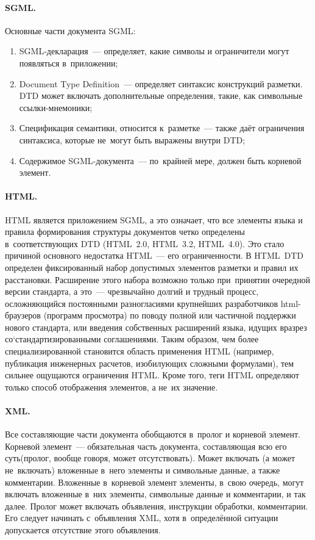 \documentclass[12pt]{article}
\theoremstyle{definition}
\theoremstyle{remark}
\numberwithin{equation}{section}
\begin{document}
\paragraph{SGML.}
Основные части документа SGML:
\begin{enumerate}
	\item SGML-декларация~--- определяет, какие символы и ограничители
    могут появляться в~приложении;
	\item Document Type Definition~--- определяет синтаксис конструкций
    разметки. DTD может включать дополнительные определения, такие,
    как символьные ссылки\nobreakdash-мнемоники;
	\item Спецификация семантики, относится к~разметке~--- также
    даёт ограничения синтаксиса, которые не~могут быть выражены
    внутри DTD;
	\item Содержимое SGML\nobreakdash-документа~--- по~крайней мере,
    должен быть корневой элемент.
\end{enumerate}

\paragraph{HTML.}
HTML является приложением SGML, а это означает, что все элементы языка
и правила формирования структуры документов четко определены в~соответствующих
DTD (HTML~2.0, HTML~3.2, HTML~4.0). Это стало причиной основного недостатка
HTML~--- его ограниченности. В HTML~DTD определен фиксированный набор
допустимых элементов разметки и правил их расстановки. Расширение этого
набора возможно только при~принятии очередной версии стандарта, а
это~--- чрезвычайно долгий и трудный процесс, осложняющийся постоянными
разногласиями крупнейших разработчиков html-браузеров (программ просмотра)
по поводу полной или частичной поддержки нового стандарта, или введения
собственных расширений языка, идущих вразрез со`стандартизированными
соглашениями. Таким образом, чем более специализированной становится
область применения HTML (например, публикация инженерных расчетов,
изобилующих сложными формулами), тем сильнее ощущаются ограничения HTML.
Кроме того, теги HTML определяют только способ отображения элементов,
а не~их значение.

\paragraph{XML.} Все составляющие части документа обобщаются в~пролог
и корневой элемент. Корневой элемент~--- обязательная часть документа,
составляющая всю его суть(пролог, вообще говоря, может отсутствовать).
Может включать (а может не~включать) вложенные в~него элементы и
символьные данные, а также комментарии. Вложенные в~корневой элемент
элементы, в~свою очередь, могут включать вложенные в~них элементы,
символьные данные и комментарии, и так далее. Пролог может включать
объявления, инструкции обработки, комментарии. Его следует начинать
с~объявления XML, хотя в~определённой ситуации допускается отсутствие
этого объявления.
\end{document}
